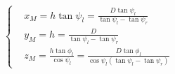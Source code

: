 \begin{equation}
	\left \{
	\begin{aligned}
		&x_M = h \tan \psi_l = \frac{D\tan \psi_l}{\tan \psi_l - \tan \psi_r}            \\
		&y_M = h = \frac{D}{\tan \psi_l - \tan \psi_r} \\
		&z_M = \frac{h\tan \phi_l}{\cos \psi_l} = \frac{D\tan \phi_l}{\cos \psi_l(\tan \psi_l - \tan \psi_r)}
	\end{aligned} \right.
	\label{eq:M_Positon_Equation}
\end{equation} 




